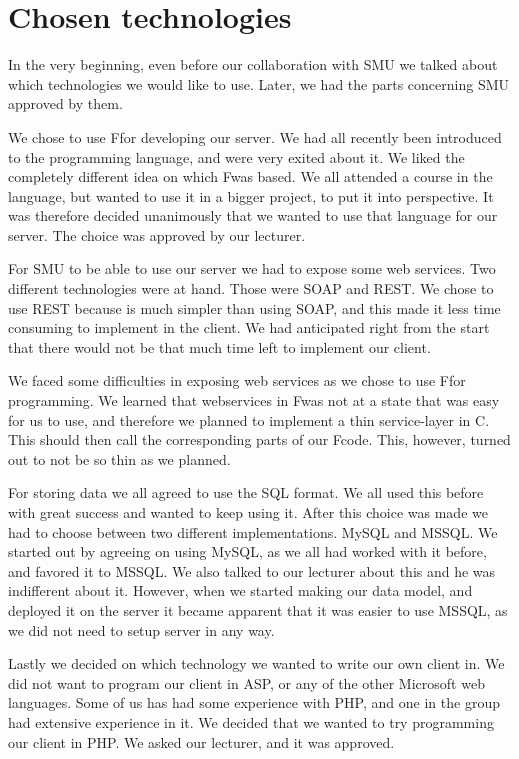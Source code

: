 \section{Chosen technologies}
In the very beginning, even before our collaboration with SMU we talked about which technologies we would like to use. Later, we had the parts concerning SMU approved by them.

We chose to use F\Sh for developing our server. We had all recently been introduced to the programming language, and were very exited about it. We liked the completely different idea on which F\Sh was based. We all attended a course in the language, but wanted to use it in a bigger project, to put it into perspective. It was therefore decided unanimously that we wanted to use that language for our server. The choice was approved by our lecturer.

For SMU to be able to use our server we had to expose some web services. Two different technologies were at hand. Those were SOAP and REST. We chose to use REST because is much simpler than using SOAP, and this made it less time consuming to implement in the client. We had anticipated right from the start that there would not be that much time left to implement our client. 

We faced some difficulties in exposing web services as we chose to use F\Sh for programming. We learned that webservices in F\Sh was not at a state that was easy for us to use, and therefore we planned to implement a thin service-layer in C\Sh. This should then call the corresponding parts of our F\Sh code. This, however, turned out to not be so thin as we planned.

For storing data we all agreed to use the SQL format. We all used this before with great success and wanted to keep using it. After this choice was made we had to choose between two different implementations. MySQL and MSSQL. We started out by agreeing on using MySQL, as we all had worked with it before, and favored it to MSSQL. We also talked to our lecturer about this and he was indifferent about it. However, when we started making our data model, and deployed it on the server it became apparent that it was easier to use MSSQL, as we did not need to setup server in any way.

Lastly we decided on which technology we wanted to write our own client in. We did not want to program our client in ASP, or any of the other Microsoft web languages. Some of us has had some experience with PHP, and one in the group had extensive experience in it. We decided that we wanted to try programming our client in PHP. We asked our lecturer, and it was approved.
\newpage